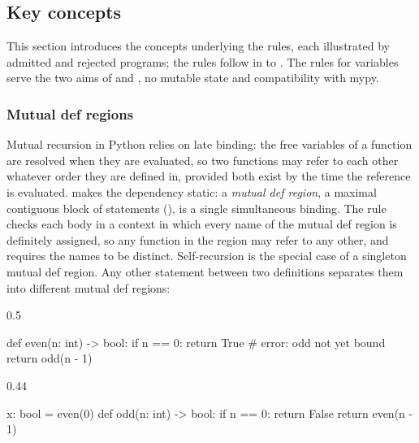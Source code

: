 \subsection{Key concepts}
\label{sec:principles}

This section introduces the concepts underlying the rules, each illustrated by admitted and rejected
programs; the rules follow in  to . The rules for
variables serve the two aims of  and , no mutable state and
compatibility with mypy.

\subsubsection{Mutual def regions}
\label{sec:mutual-recursion}

Mutual recursion in Python relies on late binding: the free variables of a function are resolved when
they are evaluated, so two functions may refer to each other whatever order they are defined in, provided
both exist by the time the reference is evaluated. \PurePy makes the
dependency static: a \emph{mutual def region}, a maximal contiguous block of  statements (), is a single simultaneous binding. The  rule checks each body in a
context in which every name of the mutual def region is definitely assigned, so any function in the region may refer
to any other, and requires the names to be distinct. Self-recursion is the special case of a singleton
mutual def region. Any other statement between two definitions separates them into different mutual def regions:

\begin{listingrow*}
\begin{listingcol}{0.5\textwidth}
\begin{python}[numbers=left, xleftmargin=1.5em]
def even(n: int) -> bool:
    if n == 0:
        return True
    # error: odd not yet bound
    return odd(n - 1)
\end{python}
\end{listingcol}
\begin{listingcol}{0.44\textwidth}
\begin{python}[numbers=left, firstnumber=6, xleftmargin=1.5em]
x: bool = even(0)
def odd(n: int) -> bool:
    if n == 0:
        return False
    return even(n - 1)
\end{python}
\end{listingcol}
\end{listingrow*}

